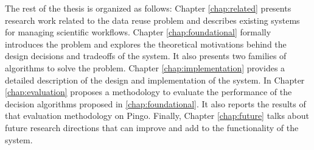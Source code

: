 The rest of the thesis is organized as follows: Chapter \ref{chap:related} presents research work related to the data reuse problem and describes existing systems for managing scientific workflows.  Chapter \ref{chap:foundational} formally introduces the problem and explores the theoretical motivations behind the design decisions and tradeoffs of the system. It also presents two families of algorithms to solve the problem. Chapter \ref{chap:implementation} provides a detailed description of the design and implementation of the system.  In Chapter \ref{chap:evaluation} proposes a methodology to evaluate the performance of the decision algorithms proposed in \ref{chap:foundational}.  It also reports the results of that evaluation methodology on Pingo.  Finally, Chapter \ref{chap:future} talks about future research directions that can improve and add to the functionality of the system.